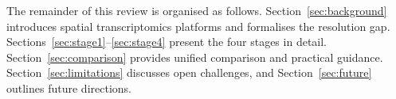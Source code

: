The remainder of this review is organised as follows. Section~\ref{sec:background} introduces spatial transcriptomics platforms and formalises the resolution gap. Sections~\ref{sec:stage1}--\ref{sec:stage4} present the four stages in detail. Section~\ref{sec:comparison} provides unified comparison and practical guidance. Section~\ref{sec:limitations} discusses open challenges, and Section~\ref{sec:future} outlines future directions.
